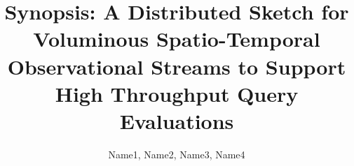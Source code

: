 \documentclass{vldb}
\begin{document}
\title{Synopsis: A Distributed Sketch for Voluminous Spatio-Temporal Observational Streams to Support High Throughput Query Evaluations}

\author{
\alignauthor
Name1, Name2, Name3, Name4\\
       \\
       \\
       \\
}


\maketitle













\end{document}
